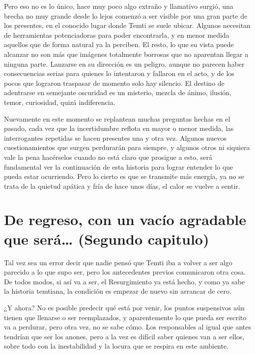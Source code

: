 \documentclass[
  spanish,
]{book}
\begin{document}
Pero eso no es lo único, hace muy poco algo extraño y llamativo surgió, una brecha no muy grande desde lo lejos comenzó a ser visible por una gran parte de los presentes, en el conocido lugar donde Temti se suele ubicar. Algunos necesitan de herramientas potenciadoras para poder encontrarla, y en menor medida aquellos que de forma natural ya la perciben. El resto, lo que su vista puede alcanzar no son más que imágenes totalmente borrosas que no aparentan llegar a ninguna parte.
Lanzarse en su dirección es un peligro, aunque no parecen haber consecuencias serias para quienes lo intentaron y fallaron en el acto, y de los pocos que lograron traspasar de momento solo hay silencio. El destino de adentrarse en semejante oscuridad es un misterio, mezcla de ánimo, ilusión, temor, curiosidad, quizá indiferencia.

Nuevamente en este momento se replantean muchas preguntas hechas en el pasado, cada vez que la incertidumbre reflota en mayor o menor medida, las interrogantes repetidas se hacen presentes una y otra vez. Algunos nuevos cuestionamientos que surgen perdurarán para siempre, y algunos otros ni siquiera vale la pena hacérselos cuando no está claro que prosigue a esto, será fundamental ver la continuación de esta historia para lograr entender lo que pueda estar ocurriendo. Pero lo cierto es que se transmite más energía, ya no se trata de la quietud apática y fría de hace unos días, el calor se vuelve a sentir.

\hypertarget{de-regreso-con-un-vacuxedo-agradable-que-seruxe1-segundo-capitulo}{%
\chapter{De regreso, con un vacío agradable que será\ldots{} (Segundo capitulo)}\label{de-regreso-con-un-vacuxedo-agradable-que-seruxe1-segundo-capitulo}}

Tal vez sea un error decir que nadie pensó que Temti iba a volver a ser algo parecido a lo que supo ser, pero los antecedentes previos comunicaron otra cosa. De todos modos, si así va a ser, el Resurgimiento ya está hecho, y como ya sabe la historia temtiana, la condición es empezar de nuevo sin arrancar de cero.

¿Y ahora?
No es posible predecir qué está por venir, los puntos suspensivos aún tienen que llenarse o ser reemplazados, y aparentemente lo que pueda ser escrito va a perdurar, pero otra vez, no se sabe cómo. Los responsables al igual que antes tendrían que ser los anones, pero a la vez es difícil saber quienes van a ser ellos, sobre todo con la inestabilidad y la locura que se respira en este ambiente.
\end{document}
